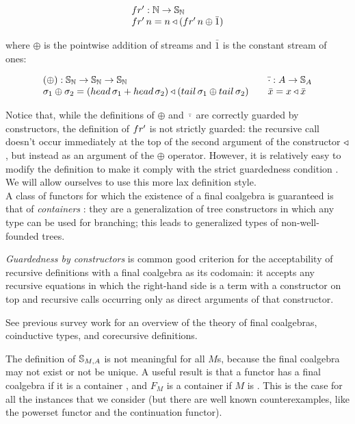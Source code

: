 $$
\begin{array}{l}
\sfp: \nat \rightarrow \stream{\nat}\\
\sfp\,n = n \scons (\sfp\,n \oplus \bar{1})
\end{array}
$$

where $\oplus$ is the pointwise addition of streams and $\bar{1}$ is the constant stream of ones:

$$
\begin{array}{l}
(\oplus): \stream{\nat}\rightarrow \stream{\nat}\rightarrow \stream{\nat}\\
\sigma_1 \oplus \sigma_2 = (\head\,\sigma_1 + \head\,\sigma_2) \scons (\tail\,\sigma_1 \oplus \tail\,\sigma_2)
\end{array}
\quad
\begin{array}{l}
\bar{\cdot}: A \rightarrow \stream{A}\\
\bar{x} = x \scons \bar{x}
\end{array}
$$

Notice that, while the definitions of $\oplus$ and $\bar{\cdot}$ are correctly guarded by constructors, the definition of $\sfp$ is not strictly guarded: the recursive call doesn't occur immediately at the top of the second argument of the constructor $\triangleleft$, but instead as an argument of the $\oplus$ operator.
However, it is relatively easy to modify the definition to make it comply with the strict guardedness condition \cite{capretta:2011}.
We will allow ourselves to use this more lax definition style. \\

A class of functors for which the existence of a final coalgebra is guaranteed is that of {\em containers} \cite{AAG:2005}: they are a generalization of tree constructors in which any type can be used for branching; this leads to generalized types of non-well-founded trees.

{\em Guardedness by constructors} is common good criterion for the acceptability of recursive definitions with a final coalgebra as its codomain: it accepts any recursive equations in which the right-hand side is a term with a constructor on top and recursive calls occurring only as direct arguments of that constructor.

See previous survey work \cite{capretta:2011} for an overview of the theory of final coalgebras, coinductive types, and corecursive definitions.

The definition of $\mathbb{S}_{M,A}$ is not meaningful for all $M$s, because the final coalgebra may not exist or not be unique.
A useful result is that a functor has a final coalgebra if it is a container \cite{AAG:2005}, and $F_M$ is a container if $M$ is \cite{capretta/fowler:2017}.
This is the case for all the instances that we consider (but there are well known counterexamples, like the powerset functor and the continuation functor).


